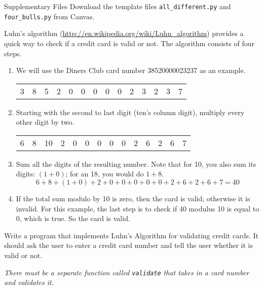 \documentclass[11pt]{cselabheader}
\begin{document}
\begin{infobox}{Supplementary Files}
Download the template files \texttt{all\_different.py} and \texttt{four\_bulls.py}
from Canvas.
\end{infobox}

\begin{ex}[luhns.py] Luhn's algorithm
 (\url{http://en.wikipedia.org/wiki/Luhn_algorithm}) provides a quick way to
 check if a credit card is valid or not. The algorithm consists of four
 steps.

 \begin{enumerate}

\item We will use the Diners Club card number 38520000023237 as an example.

 \begin{center}
 \begin{tabular}{llllllllllllll}
3 & 8 & 5 & 2 & 0 & 0 & 0 & 0 & 0 & 2 & 3 & 2 & 3 & 7\\
 \end{tabular}
 \end{center}

\item Starting with the second to last digit (ten's column digit),
     multiply every other digit by two.
 \begin{center}
 \begin{tabular}{llllllllllllll}
6 & 8 & 10 & 2 & 0 & 0 & 0 & 0 & 0 & 2 & 6 & 2 & 6 & 7
 \end{tabular}
 \end{center}

\item Sum all the digits of the resulting number.
 Note that for 10, you also sum its digits: $(1 + 0)$; for an 18, you would do $1 + 8$.
 \[ 6 + 8 + (1 + 0) + 2 + 0 + 0 + 0 + 0 + 0 + 2 + 6 + 2 + 6 + 7 = 40 \]

 \item If the total sum modulo by 10 is zero, then the card is valid;
     otherwise it is invalid.
 For this example, the last step is to check if $40$ modulus 10 is equal to 0, which is true.
 So the card is valid.
 \end{enumerate}

 Write a program that implements Luhn's Algorithm for validating credit
 cards. It should ask the user to enter a credit card number and tell the
 user whether it is valid or not.

 \emph{There must be a separate function called \texttt{validate}
that takes in a card number and
 validates it.}
\end{ex}
\end{document}
